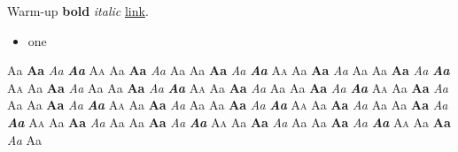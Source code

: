 \documentclass[11pt]{article}
\begin{document}
Warm-up \textbf{bold} \textit{italic} \href{https://example.org}{link}.
\begin{itemize}\item one\end{itemize}
\newcommand{\faces}{Aa {\bfseries Aa} {\itshape Aa} {\bfseries\itshape Aa} {\scshape Aa} {\sffamily Aa {\bfseries Aa} {\itshape Aa}} {\ttfamily Aa}}
{\tiny\faces} {\scriptsize\faces} {\footnotesize\faces} {\small\faces} {\normalsize\faces}
{\large\faces} {\Large\faces} {\LARGE\faces} {\huge\faces} {\Huge\faces}
\end{document}
